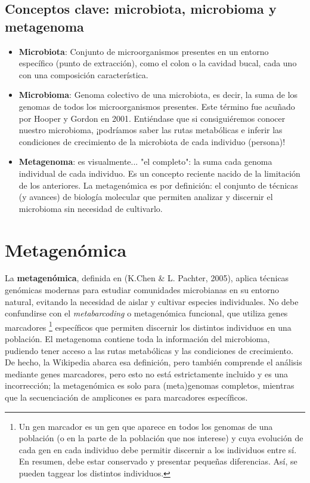\subsection{Conceptos clave: microbiota, microbioma y metagenoma}
\begin{itemize}
\item \textbf{Microbiota}: Conjunto de microorganismos presentes en un entorno específico (punto de extracción), como el colon o la cavidad bucal, cada uno con una composición característica.
\item \textbf{Microbioma}: Genoma colectivo de una microbiota, es decir, la suma de los genomas de todos los microorganismos presentes. Este término fue acuñado por Hooper y Gordon en 2001. Entiéndase que si consiguiéremos conocer nuestro microbioma, ¡podríamos saber las rutas metabólicas e inferir las condiciones de crecimiento de la microbiota de cada individuo (persona)!
\item \textbf{Metagenoma}: es visualmente... "el completo": la suma cada genoma individual de cada individuo. Es un concepto reciente nacido de la limitación de los anteriores. La metagenómica es por definición: el conjunto de técnicas (y avances) de biología molecular que permiten analizar y discernir el microbioma sin necesidad de cultivarlo.
\end{itemize}

\section{Metagenómica}
La \textbf{metagenómica}, definida en (K.Chen \& L. Pachter, 2005), aplica técnicas genómicas modernas para estudiar comunidades microbianas en su entorno natural, evitando la necesidad de aislar y cultivar especies individuales. No debe confundirse con el \textit{metabarcoding} o metagenómica funcional, que utiliza genes marcadores \footnote{Un gen marcador es un gen que aparece en todos los genomas de una población (o en la parte de la población que nos interese) y cuya evolución de cada gen en cada individuo debe permitir discernir a los individuos entre sí. En resumen, debe estar conservado y presentar pequeñas diferencias. Así, se pueden taggear los distintos individuos.} específicos que permiten discernir los distintos individuos en una población. 
El metagenoma contiene toda la información del microbioma, pudiendo tener acceso a las rutas metabólicas y las condiciones de crecimiento. De hecho, la Wikipedia abarca esa definición, pero también comprende el análisis mediante genes marcadores, pero esto no está estrictamente incluido y es una incorrección; la metagenómica es solo para (meta)genomas completos, mientras que la secuenciación de amplicones es para marcadores específicos. 


